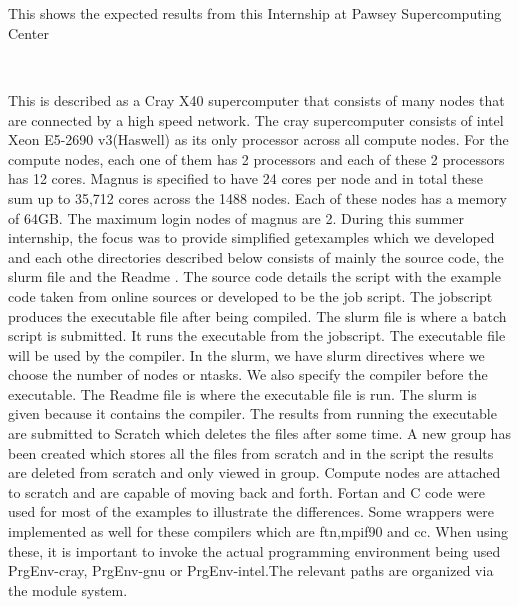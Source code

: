 \begin{Document}

\begin{abstract}




\end{abstract}
\\
\begin{Introduction}





\end{Introduction}
\
\
\\
\begin{scope}

This shows the expected results from this Internship at Pawsey Supercomputing Center
\
\



\end{scope}
\
\\

This is described as a Cray X40 supercomputer that consists of many nodes that are connected by a high speed network. The cray supercomputer consists of intel Xeon E5-2690 v3(Haswell) as its only processor across all compute nodes. For the compute nodes, each one of them has 2 processors and each of these 2 processors has 12 cores.
Magnus is specified to have 24 cores per node and in total these sum up to 35,712 cores across the 1488 nodes. Each of these nodes has a memory of 64GB. The maximum login nodes of magnus are 2.
During this summer internship, the focus was to provide simplified getexamples which we developed and each othe directories described below consists of mainly the source code, the slurm file and the Readme . The source code details the script with the example code taken from online sources or developed to be the job script. The jobscript produces the executable file after being compiled. The slurm file is where a batch script is submitted. It runs the executable from the jobscript. The executable file will be used by the compiler. In the slurm, we have slurm directives where we choose the number of nodes or ntasks. We also specify the compiler before the executable. The Readme file is where the executable file is run. The slurm is given because it contains the compiler. The results from running the executable are submitted to Scratch which deletes the files after some time. A new group has been created which stores all the files from scratch and in the script the results are deleted from scratch and only viewed in group. Compute nodes are attached to scratch and are capable of moving back and forth.
Fortan and C code were used for most of the examples to illustrate the differences. Some wrappers were implemented as well for these compilers which are ftn,mpif90 and cc. When using these, it is important to invoke the actual programming environment being used PrgEnv-cray, PrgEnv-gnu or PrgEnv-intel.The relevant paths are organized via the module system.




\end{Document}

